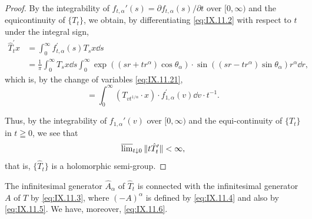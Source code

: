\begin{proof}
By the integrability of $f_{t,\alpha}'(s) = \partial f_{t,\alpha}(s) / \partial t$ over $[0, \infty)$ and the equicontinuity of $\{T_t\}$, we obtain, by differentiating \eqref{eq:IX.11.2} with respect to $t$ under the integral sign, 
\begin{equation}\label{eq:IX.11.23}
\begin{aligned}
\hat {T} _{t} ^{\prime} x &= \int_{0} ^{\infty} f _{t, \alpha} ^{\prime} (s) T _{s} x \dd s
\\
&= \frac {1}{\pi} \int_{0} ^{\infty} T _{s} x \dd s \int_{0} ^{\infty} \exp ((s r + t r ^{\alpha}) \cos \theta_{\alpha}) \cdot \sin ((s r - t r ^{\alpha}) \sin \theta_{\alpha}) r ^{\alpha} \dd r,
\end{aligned}
\end{equation}
which is, by the change of variables \eqref{eq:IX.11.21}, 
\[
= \int_{0} ^{\infty} \left(T _ {v t ^{1 / \alpha}} \cdot x\right) \cdot f _{1, \alpha} ^{\prime} (v) \dd v \cdot t ^{-1}.
\]

Thus, by the integrability of $f_{1,\alpha}'(v)$ over $[0, \infty)$ and the equi-continuity of $\{T_t\}$ in $t \geqq 0$, we see that 
\[
\varlimsup\limits_{t \downarrow 0} \| t \hat {T} _{t} ^{\prime} \| < \infty ,
\]
that is, $\{\hat{T}_t\}$ is a holomorphic semi-group.
\end{proof}

\begin{theorem}\label{thm:IX.11.Theorem.2} The infinitesimal generator $\hat{A}_{\alpha}$ of $\hat{T}_t$ is connected with the infinitesimal generator $A$ of $T$ by \eqref{eq:IX.11.3}, where $(-A)^{\alpha}$ is defined by \eqref{eq:IX.11.4} and also by \eqref{eq:IX.11.5}. We have, moreover, \eqref{eq:IX.11.6}. 
\end{theorem}

